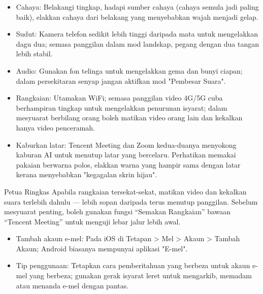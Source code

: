 
\begin{itemize}
  \item Cahaya: Belakangi tingkap, hadapi sumber cahaya (cahaya semula jadi paling baik), elakkan cahaya dari belakang yang menyebabkan wajah menjadi gelap.
  \item Sudut: Kamera telefon sedikit lebih tinggi daripada mata untuk mengelakkan dagu dua; semasa panggilan dalam mod landskap, pegang dengan dua tangan lebih stabil.
  \item Audio: Gunakan fon telinga untuk mengelakkan gema dan bunyi ciapan; dalam persekitaran senyap jangan aktifkan mod "Pembesar Suara".
  \item Rangkaian: Utamakan WiFi; semasa panggilan video 4G/5G cuba berhampiran tingkap untuk mengelakkan penurunan isyarat; dalam mesyuarat berbilang orang boleh matikan video orang lain dan kekalkan hanya video penceramah.
  \item Kaburkan latar: Tencent Meeting dan Zoom kedua-duanya menyokong kaburan AI untuk menutup latar yang bercelaru. Perhatikan memakai pakaian berwarna polos, elakkan warna yang hampir sama dengan latar kerana menyebabkan "kegagalan skrin hijau".
\end{itemize}

\begin{tcbinfo}{Petua Ringkas}
Apabila rangkaian tersekat-sekat, matikan video dan kekalkan suara terlebih dahulu — lebih sopan daripada terus menutup panggilan. Sebelum mesyuarat penting, boleh gunakan fungsi “Semakan Rangkaian” bawaan “Tencent Meeting” untuk menguji lebar jalur lebih awal.

\end{tcbinfo}


\begin{itemize}
  \item Tambah akaun e-mel: Pada iOS di Tetapan > Mel > Akaun > Tambah Akaun; Android biasanya mempunyai aplikasi "E-mel".
  \item Tip penggunaan: Tetapkan cara pemberitahuan yang berbeza untuk akaun e-mel yang berbeza; gunakan gerak isyarat leret untuk mengarkib, memadam atau menanda e-mel dengan pantas.
\end{itemize}



